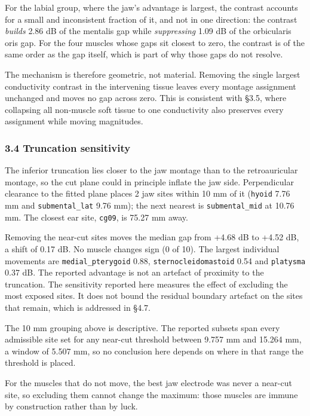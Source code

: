 \documentclass[
  11pt,
  a4paper,
]{article}
\begin{document}
For the labial group, where the jaw's advantage is largest, the contrast
accounts for a small and inconsistent fraction of it, and not in one direction:
the contrast \emph{builds} 2.86 dB of the mentalis gap while \emph{suppressing} 1.09 dB of
the orbicularis oris gap. For the four muscles
whose gaps sit closest to zero, the contrast is of the same order as the gap
itself, which is part of why those gaps do not resolve.

The mechanism is therefore geometric, not material. Removing the
single largest conductivity contrast in the intervening tissue leaves every
montage assignment unchanged and moves no gap across zero. This is consistent
with \S{}3.5, where collapsing all non-muscle soft tissue to one conductivity also
preserves every assignment while moving magnitudes.

\subsubsection{3.4 Truncation sensitivity}\label{truncation-sensitivity}

The inferior truncation lies closer to the jaw montage than to the
retroauricular montage, so the cut plane could in principle inflate the jaw
side. Perpendicular clearance to the fitted plane places 2 jaw sites within
10 mm of it (\texttt{hyoid} 7.76 mm and \texttt{submental\_lat} 9.76 mm); the next nearest is
\texttt{submental\_mid} at 10.76 mm. The closest ear site, \texttt{cg09}, is 75.27 mm away.

Removing the near-cut sites moves the median gap from +4.68 dB to +4.52 dB, a
shift of \textminus{}0.17 dB. No muscle changes sign (0 of 10). The largest individual
movements are \texttt{medial\_pterygoid} \textminus{}0.88, \texttt{sternocleidomastoid} \textminus{}0.54 and
\texttt{platysma} \textminus{}0.37 dB. The reported advantage is not an artefact of proximity to
the truncation. The sensitivity reported here measures the effect of excluding
the most exposed sites. It does not bound the residual boundary artefact on the
sites that remain, which is addressed in \S{}4.7.

The 10 mm grouping above is descriptive. The reported subsets span every
admissible site set for any near-cut threshold between 9.757 mm and 15.264 mm, a
window of 5.507 mm, so no conclusion here depends on where in that range the
threshold is placed.

For the muscles that do not move, the best jaw electrode was never a near-cut
site, so excluding them cannot change the maximum: those muscles are immune by
construction rather than by luck.
\end{document}
